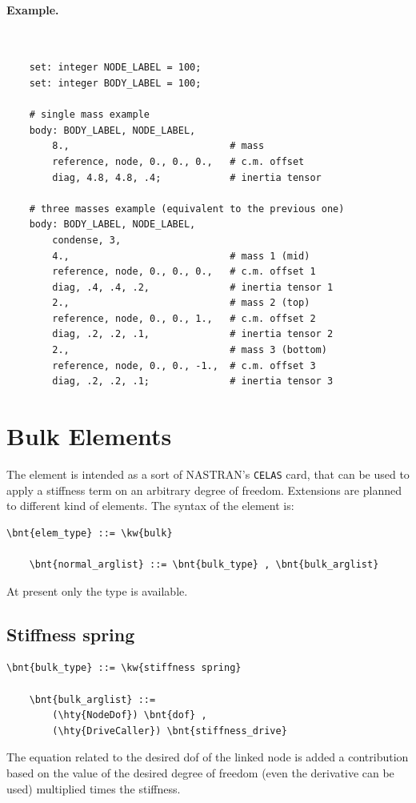 \paragraph{Example.} \
\begin{verbatim}
    set: integer NODE_LABEL = 100;
    set: integer BODY_LABEL = 100;

    # single mass example
    body: BODY_LABEL, NODE_LABEL,
        8.,                            # mass
        reference, node, 0., 0., 0.,   # c.m. offset
        diag, 4.8, 4.8, .4;            # inertia tensor

    # three masses example (equivalent to the previous one)
    body: BODY_LABEL, NODE_LABEL,
        condense, 3,
        4.,                            # mass 1 (mid)
        reference, node, 0., 0., 0.,   # c.m. offset 1
        diag, .4, .4, .2,              # inertia tensor 1
        2.,                            # mass 2 (top)
        reference, node, 0., 0., 1.,   # c.m. offset 2
        diag, .2, .2, .1,              # inertia tensor 2
        2.,                            # mass 3 (bottom)
        reference, node, 0., 0., -1.,  # c.m. offset 3
        diag, .2, .2, .1;              # inertia tensor 3
\end{verbatim}



\section{Bulk Elements}
The  element is intended as a sort of NASTRAN's \texttt{CELAS} card,
that can be used to apply a stiffness term on an arbitrary degree of freedom.
Extensions are planned to different kind of elements.
The syntax of the  element is:
\begin{Verbatim}[commandchars=\\\{\}]
    \bnt{elem_type} ::= \kw{bulk}

    \bnt{normal_arglist} ::= \bnt{bulk_type} , \bnt{bulk_arglist}
\end{Verbatim}
At present only the  type is available.

\subsection{Stiffness spring}
\begin{Verbatim}[commandchars=\\\{\}]
    \bnt{bulk_type} ::= \kw{stiffness spring}

    \bnt{bulk_arglist} ::=
        (\hty{NodeDof}) \bnt{dof} ,
        (\hty{DriveCaller}) \bnt{stiffness_drive}
\end{Verbatim}
The equation related to the desired dof of the linked node is added a
contribution based on the value of the desired degree of freedom (even the
derivative can be used) multiplied times the stiffness.

